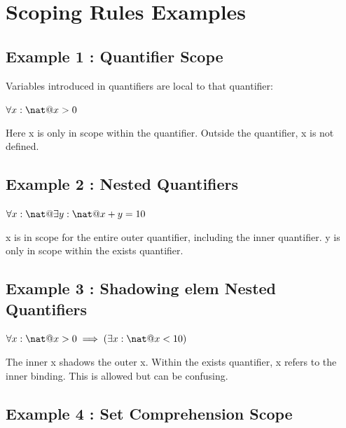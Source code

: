 \documentclass[a4paper,10pt,fleqn]{article}
\begin{document}
\section*{Scoping Rules Examples}

\begin{zed}
[Char]
\end{zed}

\subsection*{Example 1 : Quantifier Scope}

\noindent Variables introduced in quantifiers are local to that quantifier:

\bigskip

\noindent
$\forall x : \nat @ x > 0$


\noindent Here x is only in scope within the quantifier. Outside the quantifier, x is not defined.

\bigskip

\subsection*{Example 2 : Nested Quantifiers}

\noindent
$\forall x : \nat @ \exists y : \nat @ x + y = 10$


\noindent x is in scope for the entire outer quantifier, including the inner quantifier. y is only in scope within the exists quantifier.

\bigskip

\subsection*{Example 3 : Shadowing elem Nested Quantifiers}

\noindent
$\forall x : \nat @ x > 0 \implies (\exists x : \nat @ x < 10)$


\noindent The inner x shadows the outer x. Within the exists quantifier, x refers to the inner binding. This is allowed but can be confusing.

\bigskip

\subsection*{Example 4 : Set Comprehension Scope}
\end{document}
